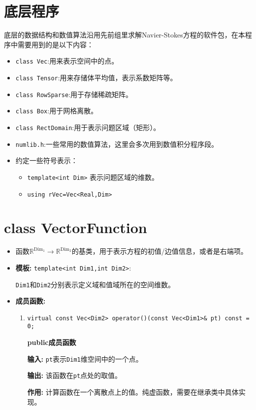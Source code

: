 \documentclass[UTF8]{ctexart}
\theoremstyle{plain}
\theoremstyle{definition}
\theoremstyle{remark}
\begin{document}
\section{底层程序}
底层的数据结构和数值算法沿用先前组里求解Navier-Stokes方程的软件包，在本程序中需要用到的是以下内容：
\begin{itemize}
    \item \texttt{class Vec}:用来表示空间中的点。
    \item \texttt{class Tensor}:用来存储体平均值，表示系数矩阵等。
    \item \texttt{class RowSparse}:用于存储稀疏矩阵。
    \item \texttt{class Box}:用于网格离散。
    \item \texttt{class RectDomain}:用于表示问题区域（矩形）。
    \item \texttt{numlib.h}:一些常用的数值算法，这里会多次用到数值积分程序段。
    \item 约定一些符号表示：
    \begin{itemize}
        \item \texttt{template<int Dim>} 表示问题区域的维数。
        \item \texttt{using rVec=Vec<Real,Dim>}
    \end{itemize}
\end{itemize}
\section{class VectorFunction}
\begin{itemize}
    \item 函数$\mathbb{R}^{\text{Dim}_{1}}\rightarrow\mathbb{R}^{\text{Dim}_{2}}$的基类，用于表示方程的初值/边值信息，或者是右端项。
    \item \textbf{模板:} \texttt{template<int Dim1,int Dim2>}:
    
    \texttt{Dim1}和\texttt{Dim2}分别表示定义域和值域所在的空间维数。
    \item \textbf{成员函数:}
    \begin{enumerate}
    \item \texttt{virtual const Vec<Dim2> operator()(const Vec<Dim1>\& pt) const = 0;}

      \textbf{public成员函数}

      \textbf{输入:} \texttt{pt}表示\texttt{Dim1}维空间中的一个点。

      \textbf{输出:} 该函数在\texttt{pt}点处的取值。

      \textbf{作用:} 计算函数在一个离散点上的值。纯虚函数，需要在继承类中具体实现。
    \end{enumerate}
\end{itemize}
\end{document}

